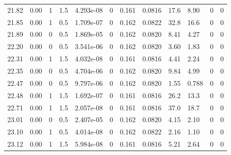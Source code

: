 \documentclass[preview]{standalone}
\begin{document}
{{{\begin{tabular}{L{1.2cm}C{1.2cm} C{0.3cm}C{0.5cm} C{1.4cm}C{1.4cm} C{1.4cm}C{1.4cm} C{1.6cm}C{1.6cm} C{1.6cm}C{1.6cm}}
  21.82  &  0.00  & 1     & 1.5 &  4.293e-08  & 0  &  0.161&   0.0816& 17.6 & 8.90   &  0 & 0  \\ 
  21.85  &  0.00  & 1     & 0.5 &  1.709e-07  & 0  &  0.162&   0.0822& 32.8 & 16.6   &  0 & 0  \\ 
  21.89  &  0.00  & 0     & 0.5 &  1.869e-05  & 0  &  0.162&   0.0820& 8.41 & 4.27   &  0 & 0  \\ 
  22.20  &  0.00  & 0     & 0.5 &  3.541e-06  & 0  &  0.162&   0.0820& 3.60 & 1.83   &  0 & 0  \\ 
  22.31  &  0.00  & 1     & 1.5 &  4.032e-08  & 0  &  0.161&   0.0816& 4.41 & 2.24   &  0 & 0  \\ 
  22.35  &  0.00  & 0     & 0.5 &  4.704e-06  & 0  &  0.162&   0.0820& 9.84 & 4.99   &  0 & 0  \\ 
  22.47  &  0.00  & 0     & 0.5 &  9.797e-06  & 0  &  0.162&   0.0820& 1.55 & 0.788   &  0 & 0  \\ 
  22.48  &  0.00  & 1     & 1.5 &  1.692e-07  & 0  &  0.161&   0.0816& 26.2 & 13.3   &  0 & 0  \\ 
  22.71  &  0.00  & 1     & 1.5 &  2.057e-08  & 0  &  0.161&   0.0816& 37.0 & 18.7   &  0 & 0  \\ 
  23.01  &  0.00  & 0     & 0.5 &  2.407e-05  & 0  &  0.162&   0.0820& 4.15 & 2.10   &  0 & 0  \\ 
  23.10  &  0.00  & 1     & 0.5 &  4.014e-08  & 0  &  0.162&   0.0822& 2.16 & 1.10   &  0 & 0  \\ 
  23.12  &  0.00  & 1     & 1.5 &  5.984e-08  & 0  &  0.161&   0.0816& 5.21 & 2.64   &  0 & 0  \\ 
\hline 
\end{tabular} 

}}}
\end{document}
